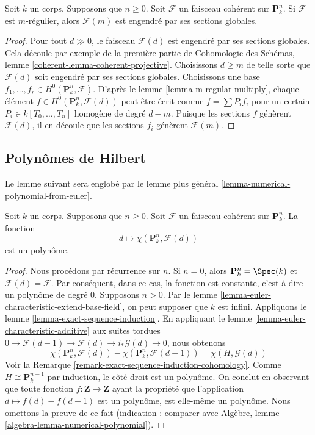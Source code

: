 \begin{lemma}
\label{lemma-m-regular-globally-generated}
Soit $k$ un corps. Supposons que $n
\geq 0$. Soit $\mathcal{F}$ un faisceau cohérent
sur $\mathbf{P}^n_k$. Si $\mathcal{F}$ est
$m$-régulier, alors $\mathcal{F}(m)$ est engendré par ses sections globales.
\end{lemma}

\begin{proof}
Pour tout $d \gg 0$, le faisceau $\mathcal{F}(d)$ est engendré par ses
sections globales. Cela découle par exemple de la première partie de
Cohomologie des Schémas, lemme
\ref{coherent-lemma-coherent-projective}. Choisissons $d \geq m$ de telle sorte
que $\mathcal{F}(d)$ soit engendré par ses sections globales. Choisissons une base $f_1,
\ldots, f_r \in H^0(\mathbf{P}^n_k, \mathcal{F})$. D'après le lemme
\ref{lemma-m-regular-multiply}, chaque élément $f \in H^0(\mathbf{P}^n_k,
\mathcal{F}(d))$ peut être écrit comme $f = \sum P_if_i$ pour un certain $P_i \in
k[T_0, \ldots, T_n]$ homogène de degré $d - m$. Puisque les sections $f$ génèrent
$\mathcal{F}(d)$, il en découle que les sections $f_i$ génèrent $\mathcal{F}(m)$.
\end{proof}

\subsection{Polynômes de Hilbert}
\label{subsection-hilbert}

\noindent
Le lemme suivant sera englobé par le lemme plus général
\ref{lemma-numerical-polynomial-from-euler}.

\begin{lemma}
\label{lemma-hilbert-polynomial}
Soit $k$ un corps. Supposons que $n \geq 0$. Soit
$\mathcal{F}$ un faisceau cohérent sur $\mathbf{P}^n_k$. La fonction
$$
d \longmapsto \chi(\mathbf{P}^n_k, \mathcal{F}(d))
$$
est un polynôme.
\end{lemma}

\begin{proof}
Nous procédons par récurrence sur $n$. Si $n =
0$, alors $\mathbf{P}^n_k = \Spec(k)$ et
$\mathcal{F}(d) = \mathcal{F}$. Par conséquent, dans
ce cas, la fonction est constante, c’est-à-dire un
polynôme de degré $0$. Supposons $n > 0$. Par le lemme
\ref{lemma-euler-characteristic-extend-base-field},
on peut supposer que $k$ est infini. Appliquons
le lemme \ref{lemma-exact-sequence-induction}. En
appliquant le lemme
\ref{lemma-euler-characteristic-additive} aux suites tordues $0 \to
\mathcal{F}(d - 1) \to \mathcal{F}(d) \to i_*\mathcal{G}(d) \to 0$, nous obtenons
$$
\chi(\mathbf{P}^n_k, \mathcal{F}(d)) -
\chi(\mathbf{P}^n_k, \mathcal{F}(d - 1)) =
\chi(H, \mathcal{G}(d))
$$
Voir la Remarque
\ref{remark-exact-sequence-induction-cohomology}. Comme $H
\cong \mathbf{P}^{n - 1}_k$ par induction, le côté droit est un
polynôme. On conclut en observant que toute fonction $f :
\mathbf{Z} \to \mathbf{Z}$ ayant la propriété que l'application
$d \mapsto f(d) - f(d - 1)$ est un polynôme, est elle-même un
polynôme. Nous omettons la preuve de ce fait (indication : comparer
avec Algèbre, lemme \ref{algebra-lemma-numerical-polynomial}).
\end{proof}

